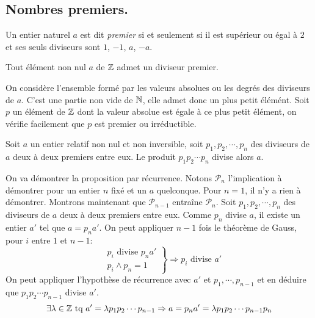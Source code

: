 \begin{propn}
\section{Nombres premiers.}
\begin{defi}
 Un entier naturel $a$ est dit \emph{premier} si et seulement si il est supérieur ou égal à $2$ et ses seuls diviseurs sont $1$, $-1$, $a$, $-a$.
\end{defi}
\begin{prop}
 Tout élément non nul $a$ de $\mathbb{Z}$ admet un diviseur premier.
\end{prop}
\begin{demo}
 On considère l'ensemble formé par les valeurs absolues ou les degrés des diviseurs de $a$. C'est une partie non vide de $\mathbb{N}$, elle admet donc un plus petit élémént. Soit $p$ un élément de $\mathbb{Z}$ dont la valeur absolue est égale à ce plus petit élément, on vérifie facilement que $p$ est premier ou irréductible. 
\end{demo}
\begin{prop}
 Soit $a$ un entier relatif non  nul et non inversible, soit $p_1, p_2, \cdots, p_n$ des diviseurs de $a$ deux à deux premiers entre eux. Le produit $p_1p_2\cdots p_n$ divise alors $a$.
\end{prop}
\begin{demo}
On va démontrer la proposition par récurrence. Notons $\mathcal{P}_n$ l'implication à démontrer pour un entier $n$ fixé et un $a$ quelconque.\newline
Pour $n=1$, il n'y a rien à démontrer. Montrons maintenant que $\mathcal{P}_{n-1}$ entraîne $\mathcal{P}_n$.\newline
Soit $p_1, p_2, \cdots, p_n$ des diviseurs de $a$ deux à deux premiers entre eux. Comme $p_n$ divise $a$, il existe un entier $a'$ tel que $a=p_na'$. On peut appliquer $n-1$ fois le théorème de Gauss, pour $i$ entre $1$ et $n-1$:
\begin{displaymath}
\left. 
\begin{aligned}
&p_i \text{ divise } p_na'\\ &p_i \wedge p_n = 1  
\end{aligned}
\right\rbrace \Rightarrow p_i \text{ divise } a'
\end{displaymath}
On peut appliquer l'hypothèse de récurrence avec $a'$ et $p_1,\cdots, p_{n-1}$ et en déduire que $p_1p_2\cdots p_{n-1}$ divise $a'$.
\begin{displaymath}
  \exists \lambda \in \Z \text{ tq } a' = \lambda p_1p_2\cdots p_{n-1}
\Rightarrow a = p_n a' = \lambda p_1p_2\cdots p_{n-1} p_n

\end{displaymath}
\end{demo}
\end{propn}
